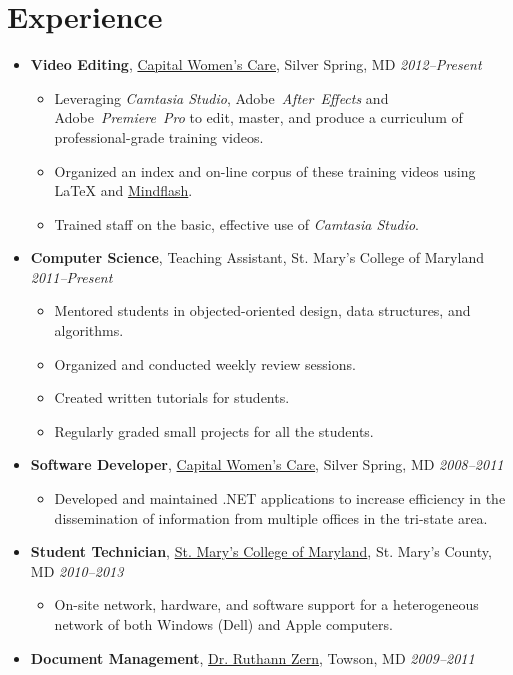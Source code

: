 \documentclass[11pt,letterpaper]{article}
\makeatletter
\newcommand{\position}[5]{\item%
  \begin{tabular*}{1.0\linewidth}{l@{\extracolsep{\fill}}r}
    #1 & #2\\
    \textit{#3} & \textit{#4---#5}
  \end{tabular*}}
\renewcommand{\position}[6][\textbullet]{%
\item[#1] \hspace*{-2em}\textbf{#4}, #2, #3\hfill
  \textit{#5--#6}\vspace*{-.8em}}
\newcommand{\cwc}{\href{http://www.cwcare.net}{Capital Women's Care}}
\newcommand{\software}[1]{\textsl{#1}}
\makeatother
\begin{document}
\section*{Experience}
\begin{itemize}
\position \cwc
          {Silver Spring, MD}
          {Video Editing}
          {2012}{Present}
          \begin{itemize}
          \item Leveraging \software{Camtasia Studio},
            Adobe~\software{After~Effects} and
            Adobe~\software{Premiere~Pro} to edit, master, and produce
            a curriculum of professional-grade training videos.
          \item Organized an index and on-line corpus of these training
            videos using \LaTeX{} and
            \href{http://www.mindflash.com/}{Mindflash}.
          \item Trained staff on the basic, effective use of
            \software{Camtasia Studio}.
          \end{itemize}

\position {Teaching Assistant}
          {St. Mary's College of Maryland}
          {Computer Science}
          {2011}{Present}
          \begin{itemize}
          \item Mentored students in objected-oriented design, data
            structures, and algorithms.
          \item Organized and conducted weekly review sessions.
          \item Created written tutorials for students.
          \item Regularly graded small projects for all the students.
          \end{itemize}

\position \cwc
          {Silver Spring, MD}
          {Software Developer}
          {2008}{2011}
          \begin{itemize}
          \item Developed and maintained .NET applications to increase
            efficiency in the dissemination of information from
            multiple offices in the tri-state area.
          \end{itemize}

\position {\href{http://oit.smcm.edu}
                {St. Mary's College of Maryland}}
          {St. Mary's County, MD}
          {Student Technician}
          {2010}{2013}
          \begin{itemize}
          \item On-site network, hardware, and software support for a
            heterogeneous network of both Windows (Dell) and Apple
            computers.
          \end{itemize}

\position {\href{http://www.cwcare.net/Provider.aspx?pid=1269}
                {Dr. Ruthann Zern}}
          {Towson, MD}
          {Document Management}
          {2009}{2011}
\end{itemize}
\end{document}
